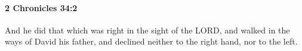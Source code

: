 
		\paragraph{2 Chronicles 34:2} %
			\label{2CHRONICLES-34-2}

			And he did that which was right in the sight of the LORD, and walked in the ways of David his father, and declined neither to the right hand, nor to the left.


